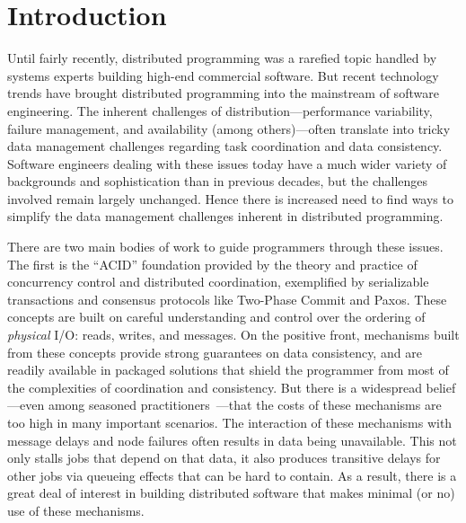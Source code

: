 \section{Introduction}

Until fairly recently, distributed programming was a rarefied topic handled by systems experts building high-end commercial software. But recent technology trends have brought distributed programming into the mainstream of software engineering.  The inherent challenges of distribution---performance variability, failure management, and availability (among others)---often translate into tricky data management challenges regarding task coordination and data consistency.  Software engineers dealing with these issues today have a much wider variety of backgrounds and sophistication than in previous decades, but the challenges involved remain largely unchanged.  Hence there is increased need to find ways to simplify the data management challenges inherent in distributed programming.

There are two main bodies of work to guide programmers through these issues.  The first is the ``ACID'' foundation provided by the theory and practice of concurrency control and distributed coordination, exemplified by serializable transactions and consensus protocols like Two-Phase Commit and Paxos.  These concepts are built on careful understanding and control over the ordering of {\em physical} I/O: reads, writes, and messages.  On the positive front, mechanisms built from these concepts provide strong guarantees on data consistency, and are readily available in packaged solutions that shield the programmer from most of the complexities of coordination and consistency.  But there is a widespread belief---even among seasoned practitioners~\cite{ladis}---that the costs of these mechanisms are too high in many important scenarios.  The interaction of these mechanisms with message delays and node failures often results in data being unavailable. This not only stalls jobs that depend on that data, it also produces transitive delays for other jobs via queueing effects that can be hard to contain.  As a result, there is a great deal of interest in building distributed software that makes minimal (or no) use of these mechanisms.

